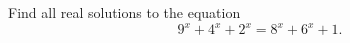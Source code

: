 \begin{problem}
    Find all real solutions to the equation
    \[
        9^{x} + 4^{x}+2^{x} = 8^{x} + 6^{x}+1.
    \]
\end{problem}
